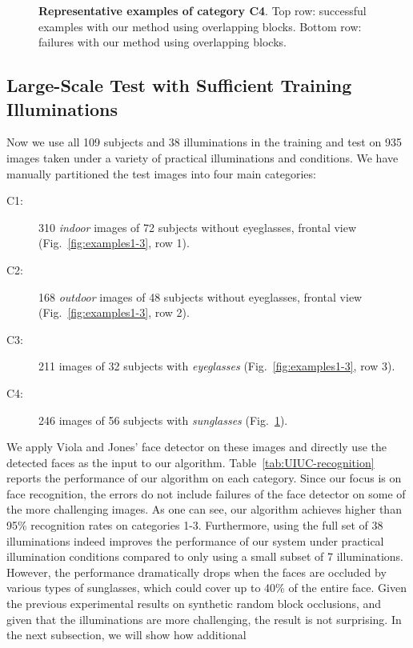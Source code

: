 \documentclass[10pt,journal,letterpaper,compsoc]{IEEEtran}
\begin{document}
\begin{figure}[t]
\begin{tabular}{@{}c@{}c@{}c@{}c@{}c@{}c@{}}
\end{tabular}
 \caption{{\bf Representative examples of category C4}. Top row: successful examples with our method using overlapping blocks. Bottom row: failures with our method using overlapping blocks.}\label{fig:examples4}
\vspace{-.55in}
\end{figure}

\subsection{Large-Scale Test with Sufficient Training
Illuminations} Now we use all 109 subjects and 38 illuminations
in the training and test on 935 images taken under a variety of
practical illuminations and conditions. We have manually partitioned the test images into four main
categories:
\begin{description}
\item[C1:] 310 \emph{indoor} images of 72 subjects without
    eyeglasses, frontal view
    (Fig.~\ref{fig:examples1-3}, row 1).
\item[C2:] 168 \emph{outdoor} images of 48 subjects without
    eyeglasses, frontal view
    (Fig.~\ref{fig:examples1-3}, row 2).
\item[C3:] 211 images of 32 subjects with \emph{eyeglasses}
    (Fig.~\ref{fig:examples1-3}, row 3).
\item[C4:] 246 images of 56 subjects with \emph{sunglasses}
    (Fig.~\ref{fig:examples4}).
\end{description}
We apply Viola and Jones' face detector on these images and
directly use the detected faces as the input to our algorithm.
Table~\ref{tab:UIUC-recognition} reports the performance of our
algorithm on each category.
Since our focus is on face
recognition, the errors do not include failures of the face
detector on some of the more challenging images.
As one can see, our algorithm achieves higher than 95\%
recognition rates on categories 1-3. Furthermore, using the
full set of 38 illuminations indeed improves the performance of
our system under practical illumination conditions compared to
only using a small subset of 7 illuminations. However, the
performance dramatically drops when the faces are occluded by
various types of sunglasses, which could cover up to 40\% of
the entire face. Given the previous experimental results on
synthetic random block occlusions, and given that the
illuminations are more challenging, the result is not
surprising. In the next subsection, we will show how additional
\end{document}
